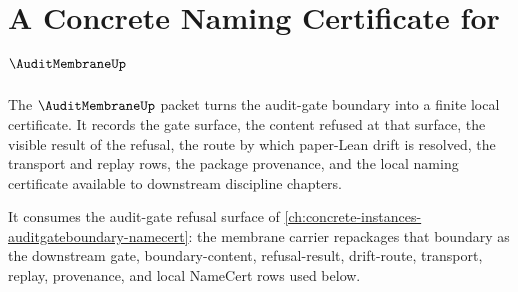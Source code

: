 \chapter{A Concrete Naming Certificate for $\AuditMembraneUp$}
\label{ch:concrete-instances-auditmembrane-namecert}

The $\AuditMembraneUp$ packet turns the audit-gate boundary into a finite local certificate. It records the gate surface, the content refused at that surface, the visible result of the refusal, the route by which paper-Lean drift is resolved, the transport and replay rows, the package provenance, and the local naming certificate available to downstream discipline chapters.

It consumes the audit-gate refusal surface of \autoref{ch:concrete-instances-auditgateboundary-namecert}: the membrane carrier repackages that boundary as the downstream gate, boundary-content, refusal-result, drift-route, transport, replay, provenance, and local NameCert rows used below.

